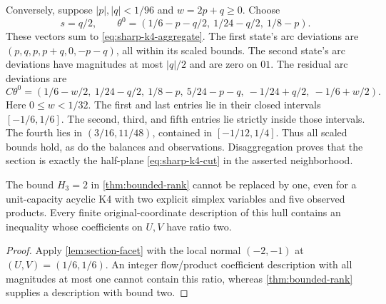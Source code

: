 Conversely, suppose $|p|,|q|<1/96$ and $w=2p+q\ge0$. Choose
\begin{equation}\label{eq:sharp-k4-witness}
 s=q/2,\qquad
 \theta^0=(1/6-p-q/2,\ 1/24-q/2,\ 1/8-p).
\end{equation}
These vectors sum to \eqref{eq:sharp-k4-aggregate}. The first state's
arc deviations are $(p,q,p,p+q,0,-p-q)$, all within its scaled bounds.
The second state's arc deviations have magnitudes at most $|q|/2$
and are zero on $01$. The residual arc deviations are
\begin{equation}\label{eq:sharp-k4-residual-arcs}
 C\theta^0=(1/6-w/2,\ 1/24-q/2,\ 1/8-p,\
              5/24-p-q,\ -1/24+q/2,\ -1/6+w/2).
\end{equation}
Here $0\le w<1/32$. The first and last entries lie in their closed
intervals $[-1/6,1/6]$. The second, third, and fifth entries lie strictly
inside those intervals. The fourth lies in $(3/16,11/48)$, contained
in $[-1/12,1/4]$. Thus all scaled bounds hold, as do the balances and
observations. Disaggregation proves that the section is exactly the
half-plane \eqref{eq:sharp-k4-cut} in the asserted neighborhood.

\begin{corollary}\label{cor:rank-three-sharp}
The bound $H_3=2$ in \cref{thm:bounded-rank} cannot be replaced by one,
even for a unit-capacity acyclic K4 with two explicit simplex variables
and five observed products. Every finite original-coordinate description
of this hull contains an inequality whose coefficients on $U,V$ have
ratio two.
\end{corollary}
\begin{proof}
Apply \cref{lem:section-facet} with the local normal $(-2,-1)$ at
$(U,V)=(1/6,1/6)$. An integer flow/product coefficient description
with all magnitudes at most one cannot contain this ratio, whereas
\cref{thm:bounded-rank} supplies a description with bound two.
\end{proof}

